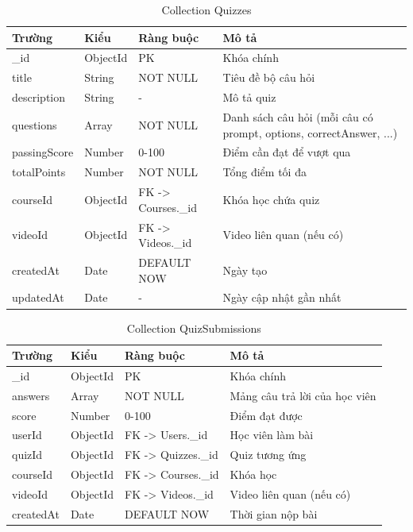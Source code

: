 \begin{table}[H]
\centering
\caption{Collection Quizzes}
\begin{tabular}{|p{2.5cm}|p{2.5cm}|p{2.5cm}|p{5cm}|}
\hline
\textbf{Trường} & \textbf{Kiểu} & \textbf{Ràng buộc} & \textbf{Mô tả} \\ \hline
\_id & ObjectId & PK & Khóa chính \\ \hline
title & String & NOT NULL & Tiêu đề bộ câu hỏi \\ \hline
description & String & - & Mô tả quiz \\ \hline
questions & Array & NOT NULL & Danh sách câu hỏi (mỗi câu có prompt, options, correctAnswer, ...) \\ \hline
passingScore & Number & 0-100 & Điểm cần đạt để vượt qua \\ \hline
totalPoints & Number & NOT NULL & Tổng điểm tối đa \\ \hline
courseId & ObjectId & FK -> Courses.\_id & Khóa học chứa quiz \\ \hline
videoId & ObjectId & FK -> Videos.\_id & Video liên quan (nếu có) \\ \hline
createdAt & Date & DEFAULT NOW & Ngày tạo \\ \hline
updatedAt & Date & - & Ngày cập nhật gần nhất \\ \hline
\end{tabular}
\end{table}

\begin{table}[H]
\centering
\caption{Collection QuizSubmissions}
\begin{tabular}{|p{2.5cm}|p{2.5cm}|p{2.5cm}|p{5cm}|}
\hline
\textbf{Trường} & \textbf{Kiểu} & \textbf{Ràng buộc} & \textbf{Mô tả} \\ \hline
\_id & ObjectId & PK & Khóa chính \\ \hline
answers & Array & NOT NULL & Mảng câu trả lời của học viên \\ \hline
score & Number & 0-100 & Điểm đạt được \\ \hline
userId & ObjectId & FK -> Users.\_id & Học viên làm bài \\ \hline
quizId & ObjectId & FK -> Quizzes.\_id & Quiz tương ứng \\ \hline
courseId & ObjectId & FK -> Courses.\_id & Khóa học \\ \hline
videoId & ObjectId & FK -> Videos.\_id & Video liên quan (nếu có) \\ \hline
createdAt & Date & DEFAULT NOW & Thời gian nộp bài \\ \hline
\end{tabular}
\end{table}

